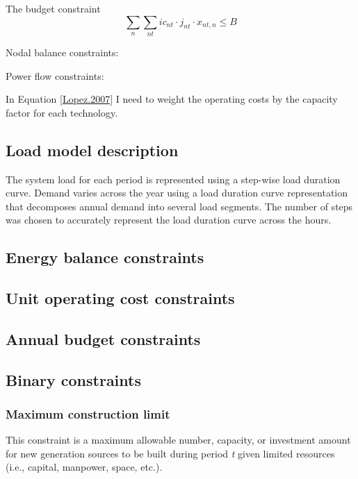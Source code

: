 \documentclass[10pt]{amsart}
\begin{document}
The budget constraint
\begin{equation}
\sum_{n}\sum_{nt} ic_{nt}\cdot j_{nt}\cdot x_{nt, n} \leq B
\end{equation}

Nodal balance constraints:

Power flow constraints:

In Equation \ref{Lopez.2007} I need to weight the operating costs by the capacity factor for each technology.

\subsection{Load model description}
The system load for each period is represented using a step-wise load duration curve. 
Demand varies across the year using a load duration curve representation that decomposes annual demand into several load segments. 
The number of steps was chosen to accurately represent the load duration curve across the hours.
\subsection{Energy balance constraints}
\subsection{Unit operating cost constraints}
\subsection{Annual budget constraints}
\subsection{Binary constraints}
\subsubsection{Maximum construction limit \nopunct}
This constraint is a maximum allowable number, capacity, or investment amount for new generation sources to be built during period \textit{t} given limited resources (i.e., capital, manpower, space, etc.). 
\end{document}
